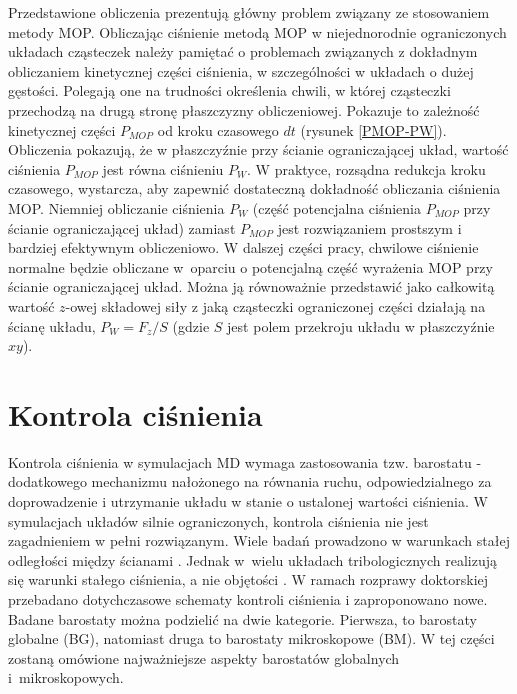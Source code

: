 \documentclass[12pt,a4paper,openright]{report} %
\begin{document}
%
%
Przedstawione obliczenia prezentują główny problem związany ze stosowaniem metody MOP. Obliczając ciśnienie metodą MOP w niejednorodnie ograniczonych układach cząsteczek należy pamiętać o problemach związanych z dokładnym obliczaniem kinetycznej części ciśnienia, w szczególności w układach o dużej gęstości. Polegają one na trudności określenia chwili, w której cząsteczki przechodzą na drugą stronę płaszczyzny obliczeniowej. Pokazuje to zależność kinetycznej części $P_{MOP}$ od kroku czasowego $dt$ (rysunek \ref{PMOP-PW}). Obliczenia pokazują, że w płaszczyźnie przy ścianie ograniczającej układ, wartość ciśnienia $P_{MOP}$ jest równa ciśnieniu $P_W$.  W praktyce, rozsądna redukcja kroku czasowego, wystarcza, aby zapewnić dostateczną dokładność obliczania ciśnienia MOP. Niemniej obliczanie ciśnienia $P_W$ (część potencjalna ciśnienia $P_{MOP}$ przy ścianie ograniczającej układ) zamiast $P_{MOP}$ jest rozwiązaniem prostszym i bardziej efektywnym obliczeniowo.
W dalszej części pracy, chwilowe ciśnienie normalne będzie obliczane w~oparciu o potencjalną część wyrażenia MOP przy ścianie ograniczającej układ. Można ją równoważnie przedstawić jako całkowitą wartość $z$-owej składowej siły z jaką cząsteczki ograniczonej części działają na ścianę układu, $P_W=F_z / S$ (gdzie $S$ jest polem przekroju układu w płaszczyźnie $xy$).
\section{Kontrola ciśnienia}
\label{barostaty}
%
Kontrola ciśnienia w symulacjach MD wymaga zastosowania tzw. barostatu - dodatkowego mechanizmu nałożonego na równania ruchu, odpowiedzialnego za doprowadzenie i utrzymanie układu w stanie o ustalonej wartości ciśnienia. W symulacjach układów silnie ograniczonych, kontrola ciśnienia nie jest zagadnieniem w pełni rozwiązanym. Wiele badań prowadzono w warunkach stałej odległości między ścianami \cite{hartkamp,LiemBrownClarke}. Jednak w~wielu układach tribologicznych realizują się warunki stałego ciśnienia, a nie objętości \cite{ponjavic14, spikes06}. W ramach rozprawy doktorskiej przebadano dotychczasowe schematy kontroli ciśnienia i zaproponowano nowe. Badane barostaty można podzielić na dwie kategorie. Pierwsza, to {barostaty globalne} (BG), natomiast druga to {barostaty mikroskopowe} (BM). W tej części zostaną omówione najważniejsze aspekty barostatów globalnych i~mikroskopowych.
\end{document}
